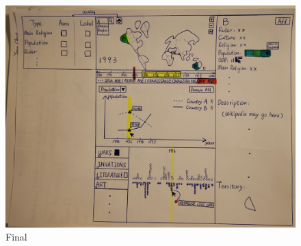 \documentclass[12pt, fullpage,letterpaper]{article}
\begin{document}
\begin{figure}[h!]
    \begin{center}
        \includegraphics[width=\textwidth]{final.JPG}
        \caption{Final}
        \label{fig:final}
    \end{center}
\end{figure}
\end{document}
